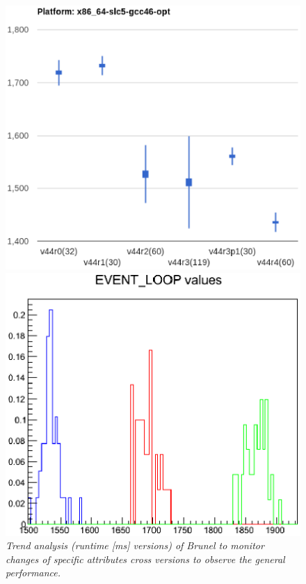 \documentclass[a4paper]{jpconf}
\begin{document}
\begin{figure}[t]
\begin{minipage}[t]{0.3\textwidth}
\includegraphics[scale=0.33]{figures/brunel_trend_analysis.eps}
\caption{\small \textit{Trend analysis (runtime [ms] \texttimes versions) of Brunel to monitor changes of specific attributes cross versions to observe the general performance.}}
\label{fig:brunel_trend}
\end{minipage}\hspace{1pc}
\begin{minipage}[t]{0.3\textwidth}
\includegraphics[scale=0.40]{figures/brunel_basic_libm.eps}

\end{minipage}
\end{figure}
\end{document}
